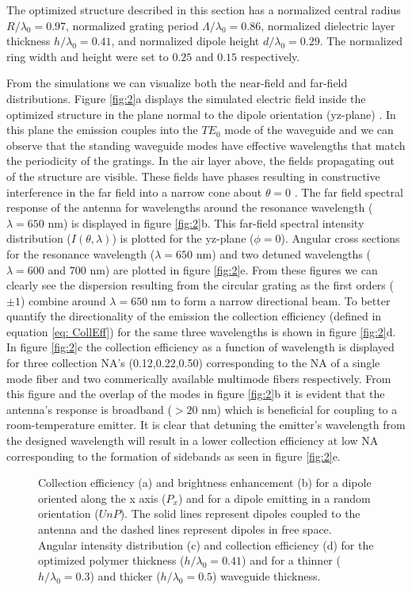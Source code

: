 \documentclass[10pt,onecolumn ]{article}
\begin{document}
The optimized structure described in this section has a normalized central radius $R/\lambda_0 = 0.97$, normalized grating period $\Lambda/\lambda_0 = 0.86$, normalized dielectric layer thickness $h/\lambda_0 = 0.41$, and normalized dipole height $d/\lambda_0 = 0.29$. The normalized ring width and height were set to $0.25$ and $0.15$ respectively. 

From the simulations we can visualize both the near-field and far-field distributions. Figure \ref{fig:2}a displays the simulated electric field inside the optimized structure in the plane normal to the dipole orientation (yz-plane) .
In this plane the emission couples into the $TE_0$ mode of the waveguide and we can observe that the standing waveguide modes have effective wavelengths that match the periodicity of the gratings.
In the air layer above, the fields propagating out of the structure are visible. 
These fields have phases resulting in constructive interference in the far field  into a narrow cone about $\theta =0$ .
The far field spectral response of the antenna for wavelengths around the resonance wavelength ($\lambda = 650$ nm) is displayed in figure \ref{fig:2}b. 
This far-field  spectral intensity distribution ($I(\theta,\lambda)$) is plotted for the yz-plane ($\phi=0$). Angular cross sections for the resonance wavelength ($\lambda=650$ nm) and two detuned wavelengths ($\lambda= 600$ and $700$ nm) are plotted in figure \ref{fig:2}e.  
From these figures we can clearly see the dispersion resulting from the circular grating as the first orders ($\pm 1$) combine around $\lambda = 650$ nm to form a narrow directional beam.
To better quantify the directionality of the emission the collection efficiency (defined in equation \ref{eq: CollEff}) for the same three wavelengths is shown in figure \ref{fig:2}d. 
In figure \ref{fig:2}c the collection efficiency as a function of wavelength is displayed for three collection NA's (0.12,0.22,0.50) corresponding to the NA of a single mode fiber and two commerically available multimode fibers respectively.
From this figure and  the overlap of the modes in figure \ref{fig:2}b it is evident that the antenna's response is broadband ($> 20$ nm)  which is beneficial for coupling to a room-temperature emitter. 
It is clear that detuning the emitter's wavelength from the designed wavelength will result in a lower collection efficiency at low NA corresponding to the formation of sidebands as seen in figure \ref{fig:2}e.
\begin{figure}[t!]
\caption{Collection efficiency (a) and brightness enhancement (b) for a dipole oriented along the x axis ($P_x$) and for a dipole emitting in a random orientation ($UnP$).  The solid lines represent dipoles coupled to the antenna and the dashed lines represent dipoles in free space. Angular intensity distribution (c) and collection efficiency (d) for the optimized polymer thickness ($h/\lambda_0 =0.41$) and for a thinner ($h/\lambda_0 = 0.3$)  and thicker ($h/\lambda_0 =0.5$) waveguide thickness. }
\label{fig:3}
\end{figure}
\end{document}
